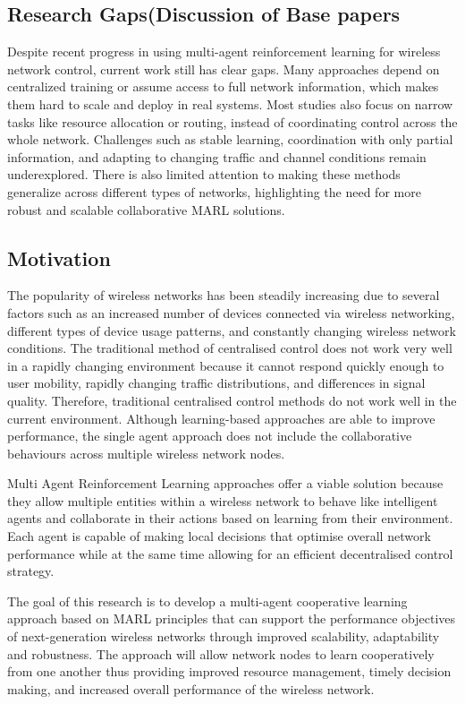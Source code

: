 \documentclass[a4paper,fleqn]{cas-dc}
\numberwithin{equation}{section}
\begin{document}
\subsection{Research Gaps(Discussion of Base papers}
Despite recent progress in using multi-agent reinforcement learning for wireless network control, current work still has clear gaps. Many approaches depend on centralized training or assume access to full network information, which makes them hard to scale and deploy in real systems. Most studies also focus on narrow tasks like resource allocation or routing, instead of coordinating control across the whole network. Challenges such as stable learning, coordination with only partial information, and adapting to changing traffic and channel conditions remain underexplored. There is also limited attention to making these methods generalize across different types of networks, highlighting the need for more robust and scalable collaborative MARL solutions.

\subsection{Motivation}
The popularity of wireless networks has been steadily increasing due to several factors such as an increased number of devices connected via wireless networking, different types of device usage patterns, and constantly changing wireless network conditions. The traditional method of centralised control does not work very well in a rapidly changing environment because it cannot respond quickly enough to user mobility, rapidly changing traffic distributions, and differences in signal quality. Therefore, traditional centralised control methods do not work well in the current environment. Although learning-based approaches are able to improve performance, the single agent approach does not include the collaborative behaviours across multiple wireless network nodes.

Multi Agent Reinforcement Learning  approaches offer a viable solution because they allow multiple entities within a wireless network to behave like intelligent agents and collaborate in their actions based on learning from their environment. Each agent is capable of making local decisions that optimise overall network performance while at the same time allowing for an efficient decentralised control strategy.

The goal of this research is to develop a multi-agent cooperative learning approach based on MARL principles that can support the performance objectives of next-generation wireless networks through improved scalability, adaptability and robustness. The approach will allow network nodes to learn cooperatively from one another thus providing improved resource management, timely decision making, and increased overall performance of the wireless network.
\end{document}
